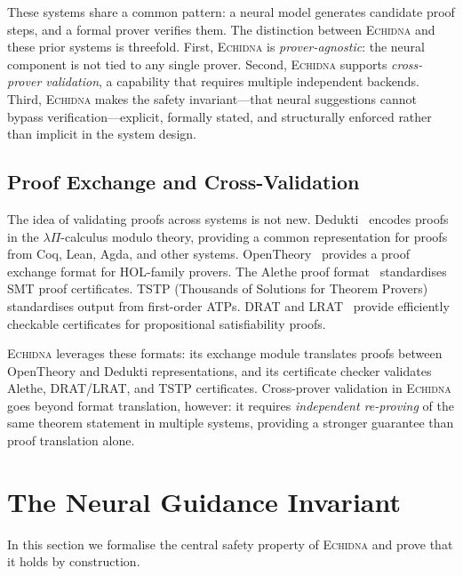 \documentclass[11pt,a4paper]{article}
\newcommand{\echidna}{\textsc{Echidna}}
\begin{document}
These systems share a common pattern: a neural model generates candidate proof
steps, and a formal prover verifies them. The distinction between
\echidna{} and these prior systems is threefold. First, \echidna{} is
\emph{prover-agnostic}: the neural component is not tied to any single prover.
Second, \echidna{} supports \emph{cross-prover validation}, a capability that
requires multiple independent backends. Third, \echidna{} makes the safety
invariant---that neural suggestions cannot bypass verification---explicit,
formally stated, and structurally enforced rather than implicit in the system
design.

\subsection{Proof Exchange and Cross-Validation}

The idea of validating proofs across systems is not new.
Dedukti~\citep{dedukti} encodes proofs in the $\lambda\Pi$-calculus modulo
theory, providing a common representation for proofs from Coq, Lean, Agda, and
other systems. OpenTheory~\citep{opentheory} provides a proof exchange
format for HOL-family provers. The Alethe proof format~\citep{alethe}
standardises SMT proof certificates. TSTP (Thousands of Solutions for Theorem
Provers)~\citep{tstp} standardises output from first-order ATPs. DRAT and
LRAT~\citep{drat} provide efficiently checkable certificates for propositional
satisfiability proofs.

\echidna{} leverages these formats: its exchange module translates proofs
between OpenTheory and Dedukti representations, and its certificate checker
validates Alethe, DRAT/LRAT, and TSTP certificates. Cross-prover validation in
\echidna{} goes beyond format translation, however: it requires
\emph{independent re-proving} of the same theorem statement in multiple
systems, providing a stronger guarantee than proof translation alone.


\section{The Neural Guidance Invariant}
\label{sec:invariant}

In this section we formalise the central safety property of \echidna{} and
prove that it holds by construction.
\end{document}

